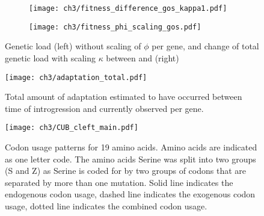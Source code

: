 \begin{figure}[h]
    \centering
    \begin{subfigure}
        \centering
        \texttt{[image: ch3/fitness\_difference\_gos\_kappa1.pdf]}
    \end{subfigure}
    \begin{subfigure}
        \centering
        \texttt{[image: ch3/fitness\_phi\_scaling\_gos.pdf]}
    \end{subfigure}
    \caption{Genetic load (left) without scaling of $\phi$ per gene, and change of total genetic load with scaling $\kappa$ between \gossypii and \kluyveri (right)}
    \label{fig:sne_scaling}
\end{figure}
\null
\vfill
\clearpage
\null
\vfill
\begin{figure}[H]
     \centering
	\texttt{[image: ch3/adaptation\_total.pdf]}
	\caption{Total amount of adaptation estimated to have occurred between time of introgression and currently observed per gene.}
	\label{fig:adapt_tot}
\end{figure}
\null
\vfill
\clearpage

\begin{figure}[H]
     \centering
	\texttt{[image: ch3/CUB\_cleft\_main.pdf]}
	\caption{Codon usage patterns for 19 amino acids. Amino acids are indicated as one letter code. 
	The amino acids Serine was split into two groups (S and Z) as Serine is coded for by two groups of codons that are separated by more than one mutation.
	Solid line indicates the endogenous codon usage, dashed line indicates the exogenous codon usage, dotted line indicates the combined codon usage.}
	\label{fig:cub_all_sets}
\end{figure}
\doublespacing